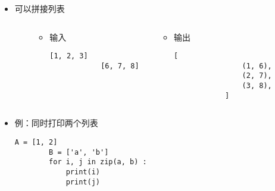 \begin{frame} [fragile]
	\frametitle{}
	\begin{itemize}
	\item {}可以拼接列表
	\begin{columns}
		\begin{column}[T]{.1\textwidth}
		\end{column}
		\begin{column}[T]{.4\textwidth}
			\begin{itemize}
			\item 输入
			\begin{lstlisting}[style=pythonstyle, gobble=12, texcl]
			[1, 2, 3]
			[6, 7, 8]
			\end{lstlisting}
			\end{itemize}
		\end{column}
		\begin{column}[T]{.4\textwidth}
			\begin{itemize}
			\item 输出
			\begin{lstlisting}[style=pythonstyle, gobble=12, texcl]
			[
				(1, 6),
				(2, 7),
				(3, 8),
			]
			\end{lstlisting}
			\end{itemize}
		\end{column}
		\begin{column}[T]{.1\textwidth}
		\end{column}
	\end{columns}
	\item 例：同时打印两个列表
		\begin{lstlisting}[style=pythonstyle, gobble=8, texcl]
		A = [1, 2]
		B = ['a', 'b']
		for i, j in zip(a, b) :
			print(i)
			print(j)
		\end{lstlisting}
	\end{itemize}
\end{frame}

